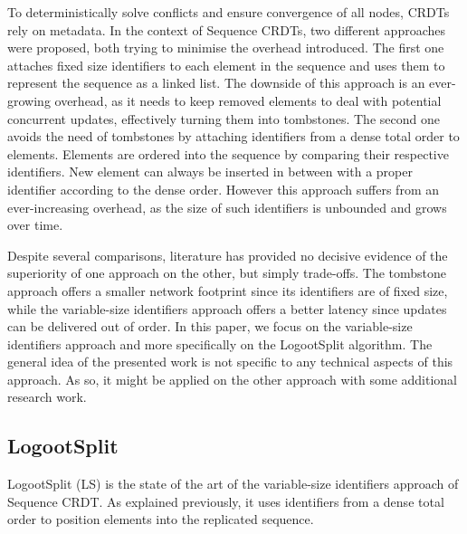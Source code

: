 \documentclass[10pt,journal,compsoc]{IEEEtran}
\begin{document}
To deterministically solve conflicts and ensure convergence of all nodes, \acp{CRDT} rely on metadata.
In the context of Sequence \acp{CRDT}, two different approaches were proposed, both trying to minimise the overhead introduced.
The first one \cite{oster:inria-00108523, Weiss_2007, ahmednacer:inria-00629503, ROH2011354, briot:hal-01343941} attaches fixed size identifiers to each element in the sequence and uses them to represent the sequence as a linked list.
The downside of this approach is an ever-growing overhead, as it needs to keep removed elements to deal with potential concurrent updates, effectively turning them into tombstones.
The second one \cite{5158449,WeissICDCS09,weiss:hal-00450416,AndreCollaborateCom2013,lseq2013,lseq2017} avoids the need of tombstones by attaching identifiers from a dense total order to elements.
Elements are ordered into the sequence by comparing their respective identifiers.
New element can always be inserted in between with a proper identifier according to the dense order.
However this approach suffers from an ever-increasing overhead, as the size of such identifiers is unbounded and grows over time.

Despite several comparisons\cite{ahmednacer:inria-00629503,briot:hal-01343941,lseq2017}, literature has provided no decisive evidence of the superiority of one approach on the other, but simply trade-offs.
The tombstone approach offers a smaller network footprint since its identifiers are of fixed size, while the variable-size identifiers approach offers a better latency since updates can be delivered out of order.
In this paper, we focus on the variable-size identifiers approach and more specifically on the LogootSplit algorithm.
The general idea of the presented work is not specific to any technical aspects of this approach.
As so, it might be applied on the other approach with some additional research work.

\subsection{LogootSplit}

LogootSplit (LS) \cite{AndreCollaborateCom2013} is the state of the art of the variable-size identifiers approach of Sequence \ac{CRDT}.
As explained previously, it uses identifiers from a dense total order to position elements into the replicated sequence.
\end{document}
